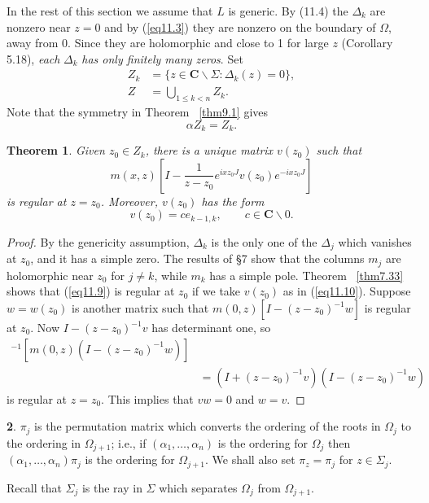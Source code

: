 \documentclass{surv-l}
\theoremstyle{plain}
\newtheorem{theorem}{Theorem}[section]
\theoremstyle{definition}
\newtheorem{definition}[theorem]{\sc{Definition}}
\numberwithin{equation}{chapter}
\begin{document}
In the rest of this section we assume that $L$ is generic. By (11.4) the $\Delta_{k}$ are nonzero near $z=0$ and by (\ref{eq11.3}) they are nonzero on the boundary of $\Omega$, away from $0$. Since they are holomorphic and close to 1 for large $z$ (Corollary 5.18), \emph{each} $\Delta_{k}$ \emph{has only finitely many zeros}. Set
\setcounter{equation}{5}
\begin{align}\label{eq11.6}
Z_{k}&=\{z\in \mathbf{C}\backslash \Sigma:\Delta_{k}(z)=0\},\\ \nonumber
Z&=\bigcup_{1\leq k<n}Z_{k}.
\end{align}
Note that the symmetry in Theorem ~\ref{thm9.1} gives
\begin{equation}\label{eq11.7}
\alpha Z_{k}=Z_{k}.
\end{equation}
\setcounter{theorem}{7}
\begin{theorem}\label{thm11.8}  Given $z_{0}\in Z_{k}$,  there is a  unique matrix $v(z_{0})$  such that
\setcounter{equation}{8}
\begin{equation}\label{eq11.9}
m(x, z)\left[I-\frac{1}{z-z_{0}}e^{ixz_{0}J}v(z_{0})e^{-ixz_{0}J}\right]
\end{equation}
is regular at $z=z_{0}$. Moreover, $v(z_{0})$ has the form
\begin{equation}\label{eq11.10}
v(z_{0})=ce_{k-1,k},\qquad c\in \mathbf{C}\backslash 0.
\end{equation}
\end{theorem}

\begin{proof} By the genericity assumption, $\Delta_{k}$ is the only one of the $\Delta_{j}$ which vanishes at $z_{0}$, and it has a simple zero. The results of \S 7 show that the columns $m_{j}$ are holomorphic near $z_{0}$ for $j \neq k$, while $m_{k}$ has a simple pole. Theorem ~\ref{thm7.33} shows that (\ref{eq11.9}) is regular at $z_{0}$ if we take $v(z_{0})$ as in (\ref{eq11.10}). Suppose
$w=w(z_{0})$ is another matrix such that $m(0, z)[I-(z-z_{0})^{-1}w]$ is regular at $z_{0}$. Now $I-(z-z_{0})^{-1}v$ has determinant one, so
\begin{align*}
[m(0, z)(I-&(z-z_{0})^{-1}v)]^{-1}[m(0, z)(I-(z-z_{0})^{-1}w)]\\
&=(I+(z-z_{0})^{-1}v)(I-(z -z_{0})^{-1}w)
\end{align*}
is regular at $z=z_{0}$. This implies that $vw=0$ and $w=v$.
\end{proof}
\setcounter{theorem}{10}
\begin{definition}\label{defi11.11} $\pi_{j}$ is the permutation matrix which converts the ordering of the roots in $\Omega_{j}$ to the ordering in $\Omega_{j+1}$; i.e., if $(\alpha_{1},\ldots, \alpha_{n})$ is the ordering for $\Omega_{j}$ then $(\alpha_{1},\ldots, \alpha_{n})\pi_{j}$ is the ordering for $\Omega_{j+1}$. We shall also set $\pi_{z}=\pi_{j}$ for $z\in\Sigma_{j}$.
\end{definition}
Recall that $\Sigma_{j}$ is the ray in $\Sigma$ which separates $\Omega_{j}$ from $\Omega_{j+1}$.
\end{document}
